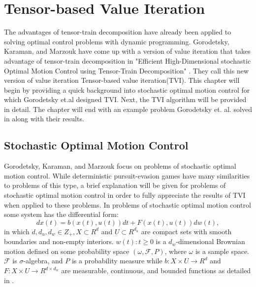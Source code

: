 \chapter{Tensor-based Value Iteration}\label{chp:tvi}

The advantages of tensor-train decomposition have already been applied to solving optimal control problems with dynamic programming. Gorodetsky, Karaman, and Marzouk have come up with a version of value iteration that takes advantage of tensor-train decomposition in "Efficient High-Dimensional stochastic Optimal Motion Control using Tensor-Train Decomposition" \cite{Gorod}. They call this new version of value iteration Tensor-based value iteration(TVI). This chapter will begin by providing a quick background into stochastic optimal motion control for which Gorodetsky et.al designed TVI. Next, the TVI algorithm will be provided in detail. The chapter will end with an example problem Gorodetsky et. al. solved in \cite{Gorod} along with their results. 

\section{Stochastic Optimal Motion Control}
Gorodetsky, Karaman, and Marzouk focus on problems of stochastic optimal motion control. While deterministic pursuit-evasion games have many similarities to problems of this type, a brief explanation will be given for problems of stochastic optimal motion control in order to fully appreciate the results of TVI when applied to these problems. In problems of stochastic optimal motion control some system has the differential form:
\begin{equation}\label{eqn7}
dx(t) = b(x(t),u(t))dt + F(x(t),u(t))dw(t),
\end{equation}
in which $d,d_u,d_w \in Z_+, X \subset R^d$ and $U \subset R^{d_u}$ are compact sets with smooth  boundaries and non-empty interiors. ${w(t):t \geq 0}$ is a $d_w$-dimensional Brownian motion defined on some probability space $(\omega, \mathscr{F},P)$, where $\omega$ is a sample space. $\mathscr{F}$ is $\sigma$-algebra, and $P$ is a probability measure while $b:X \times U \rightarrow R^d$ and $F: X \times U \rightarrow R^{d \times d_w}$ are measurable, continuous, and bounded functions as detailed in \cite{Gorod}. 


